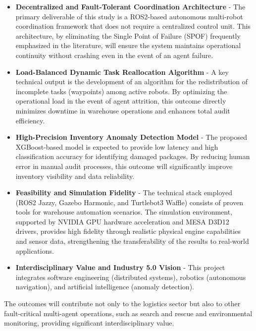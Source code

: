 \documentclass[conference]{IEEEtran}
\begin{document}
\begin{itemize}
    
    \item \textbf{Decentralized and Fault-Tolerant Coordination Architecture} - The primary deliverable of this study is a ROS2-based autonomous multi-robot coordination framework that does not require a centralized control unit. This architecture, by eliminating the Single Point of Failure (SPOF) frequently emphasized in the literature, will ensure the system maintains operational continuity without crashing even in the event of an agent failure\cite{chandran2024network}.
    
    \item \textbf{Load-Balanced Dynamic Task Reallocation Algorithm} - A key technical output is the development of an algorithm for the redistribution of incomplete tasks (waypoints) among active robots. By optimizing the operational load in the event of agent attrition, this outcome directly minimizes downtime in warehouse operations and enhances total audit efficiency\cite{miele2025distributed}.
    
    \item \textbf{High-Precision Inventory Anomaly Detection Model} - The proposed XGBoost-based model is expected to provide low latency and high classification accuracy for identifying damaged packages. By reducing human error in manual audit processes, this outcome will significantly improve inventory visibility and data reliability\cite{arvind2025intelligent}.
    
    \item \textbf{Feasibility and Simulation Fidelity} - The technical stack employed (ROS2 Jazzy, Gazebo Harmonic, and Turtlebot3 Waffle) consists of proven tools for warehouse automation scenarios\cite{leite2024coordination}. The simulation environment, supported by NVIDIA GPU hardware acceleration and MESA D3D12 drivers, provides high fidelity through realistic physical engine capabilities and sensor data, strengthening the transferability of the results to real-world applications.
    
    \item \textbf{Interdisciplinary Value and Industry 5.0 Vision} - This project integrates software engineering (distributed systems), robotics (autonomous navigation), and artificial intelligence (anomaly detection).     
\end{itemize}

The outcomes will contribute not only to the logistics sector but also to other fault-critical multi-agent operations, such as search and rescue and environmental monitoring, providing significant interdisciplinary value.
\end{document}
